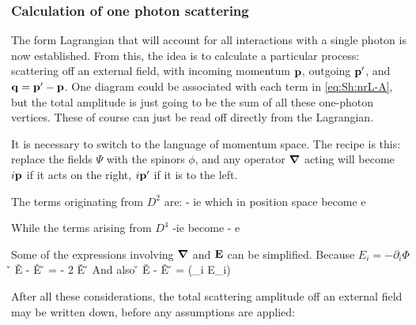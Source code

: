 \subsubsection{Calculation of one photon scattering}



The form Lagrangian that will account for all interactions with a single photon is now established.  From this, the idea is to calculate a particular process: scattering off an external field, with incoming momentum $\mathbf{p}$, outgoing $\mathbf{p'}$, and $\mathbf{q} = \mathbf{p'} - \mathbf{p}$. 
One diagram could be associated with each term in \eqref{eq:Sh:nrL-A}, but the total amplitude is just going to be the sum of all these one-photon vertices.  These of course can just be read off directly from the Lagrangian.

It is necessary to switch to the language of momentum space.  The recipe is this: replace the fields $\Psi$ with the spinors $\phi$, and any operator $\grad$ acting will become $i\mathbf{p}$ if it acts on the right, $i\mathbf{p'}$ if it is to the left.

The terms originating from $D^2$ are:
\beq
	- ie   
\eeq
which in position space become
\beq
	e  
\eeq

While the terms arising from $D^4$
\beq
-ie  
\eeq
become
\beq
- e  
\eeq


Some of the expressions involving $\grad$ and $\mathbf{E}$ can be simplified.  Because $E_i = -\partial_i \Phi$
\beq
	\v{\grad} \times \v{E} - \v{E} \times \v{\grad} =  - 2 \v{E} \times \v{\grad}
\eeq
And also
\beq
\v{\grad} \smalldot \v{E} - \v{E} \smalldot \v{\grad} = (\partial_i E_i)
\eeq


After all these considerations, the total scattering amplitude off an external field may be written down, before any assumptions are applied:



